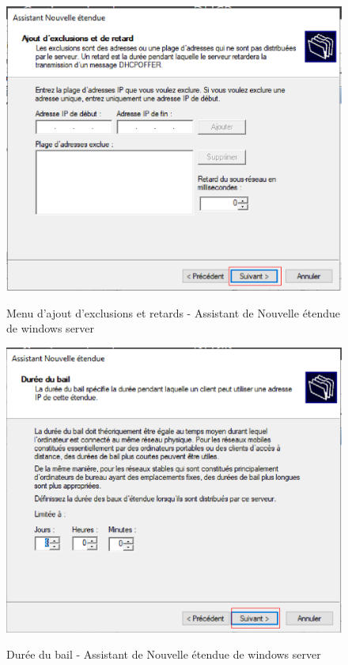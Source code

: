 \begin{figure}[h!]
	\begin{center}
		\caption{Menu d'ajout d'exclusions et retards - Assistant de Nouvelle étendue de windows server}
		\includegraphics[scale=0.7]{WS_Screenshots/41.png}
		\label{Funcs_WinS/13}
	\end{center}
\end{figure}
\FloatBarrier 
    

\begin{figure}[h!]
	\begin{center}
		\caption{Durée du bail - Assistant de Nouvelle étendue de windows server}
		\includegraphics[scale=0.7]{WS_Screenshots/42.png}
		\label{Funcs_WinS/14}
	\end{center}
\end{figure}
\FloatBarrier 
    

